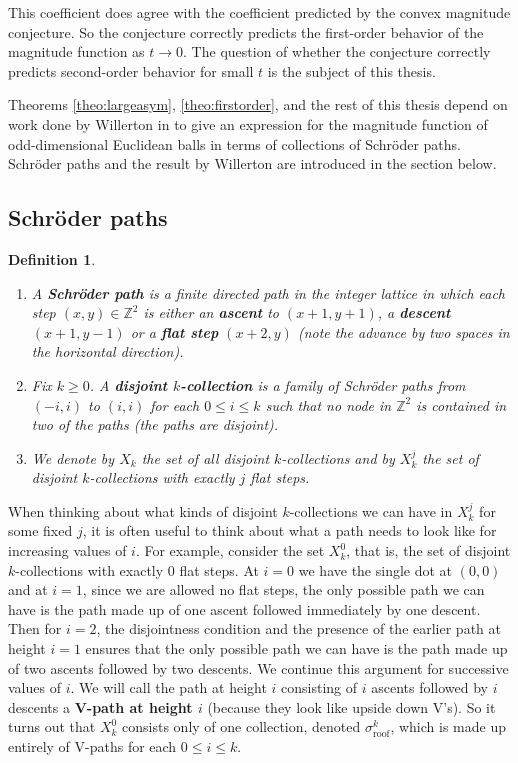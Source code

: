 \documentclass[11pt]{article}
\newcommand{\Z}{\mathbb{Z}}
\theoremstyle{mythm}
\newtheorem{defn}{Definition}[section]
\begin{document}
This coefficient does agree with the coefficient predicted by the convex magnitude conjecture. So the conjecture correctly predicts the first-order behavior of the magnitude function as $t\to0$. The question of whether the conjecture correctly predicts second-order behavior for small $t$ is the subject of this thesis.

Theorems \ref{theo:largeasym}, \ref{theo:firstorder}, and the rest of this thesis depend on work done by Willerton in \cite{willerton_magnitude_2017} to give an expression for the magnitude function of odd-dimensional Euclidean balls in terms of collections of Schröder paths. Schröder paths and the result by Willerton are introduced in the section below.

\subsection{Schröder paths}

\begin{defn}
\begin{enumerate}[label=$\bullet$]
\item A \textbf{Schröder path} is a finite directed path in the integer lattice in which each step $(x,y)\in\Z^2$ is either an \textbf{ascent} to $(x+1,y+1)$, a \textbf{descent} $(x+1,y-1)$ or a \textbf{flat step} $(x+2,y)$ (note the advance by \emph{two} spaces in the horizontal direction).
\item Fix $k\geq0$. A \textbf{disjoint $k$-collection} is a family of Schröder paths from $(-i,i)$ to $(i,i)$ for each $0\leq i\leq k$ such that no node in $\Z^2$ is contained in two of the paths (the paths are disjoint).
\item We denote by $X_k$ the set of all disjoint $k$-collections and by $X_k^j$ the set of disjoint $k$-collections with exactly $j$ flat steps.
\end{enumerate}
\end{defn}

When thinking about what kinds of disjoint $k$-collections we can have in $X_k^j$ for some fixed $j$, it is often useful to think about what a path needs to look like for increasing values of $i$. For example, consider the set $X_k^0$, that is, the set of disjoint $k$-collections with exactly 0 flat steps. At $i = 0$ we have the single dot at $(0,0)$ and at $i = 1$, since we are allowed no flat steps, the only possible path we can have is the path made up of one ascent followed immediately by one descent. Then for $i = 2$, the disjointness condition and the presence of the earlier path at height $i=1$ ensures that the only possible path we can have is the path made up of two ascents followed by two descents. We continue this argument for successive values of $i$. We will call the path at height $i$ consisting of $i$ ascents followed by $i$ descents a \textbf{V-path at height $i$} (because they look like upside down V's). So it turns out that $X_k^0$ consists only of one collection, denoted $\sigma_{\text{roof}}^k$, which is made up entirely of V-paths for each $0\leq i\leq k$.
\end{document}
